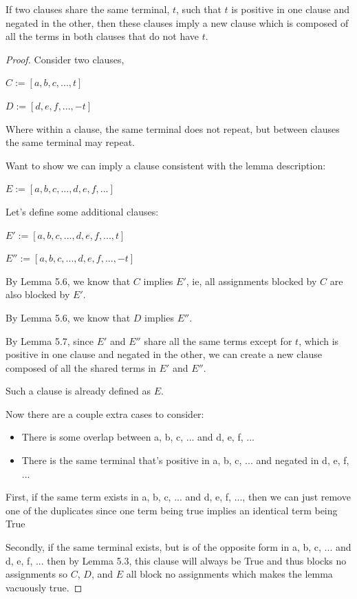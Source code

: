 \documentclass[manuscript]{acmart}
\begin{document}
    \begin{lemma}
        If two clauses share the same terminal, $t$, such that $t$ is 
        positive in one clause and negated in the other, then these clauses 
        imply a new clause which is composed of all the terms in both clauses 
        that do not have $t$.
    \end{lemma}
    \begin{proof}
        Consider two clauses, 

        $C := [a, b, c, ..., t]$
        
        $D := [d, e, f, ..., -t]$

        Where within a clause, the same terminal does not repeat, but between
        clauses the same terminal may repeat.

        Want to show we can imply a clause consistent with the lemma description:

        $E := [a, b, c, ..., d, e, f, ...]$

        Let's define some additional clauses:

        $E' := [a, b, c, ..., d, e, f, ..., t]$

        $E'' := [a, b, c, ..., d, e, f, ..., -t]$

        By Lemma 5.6, we know that $C$ implies $E'$, ie, all assignments blocked by
        $C$ are also blocked by $E'$.

        By Lemma 5.6, we know that $D$ implies $E''$.

        By Lemma 5.7, since $E'$ and $E''$ share all the same terms except 
        for $t$, which is positive in one clause and negated in the other, 
        we can create a new clause composed of all the shared terms in $E'$ 
        and $E''$.

        Such a clause is already defined as $E$.

        Now there are a couple extra cases to consider:
        
        \begin{itemize}
            \item There is some overlap between a, b, c, ... and d, e, f, ...
            \item There is the same terminal that's positive in a, b, c, ...
            and negated in d, e, f, ...
        \end{itemize}

        First, if the same term exists in a, b, c, ... and d, e, f, ..., then we
        can just remove one of the duplicates since one term being true implies an identical term being True

        Secondly, if the same terminal exists, but is of the opposite form in a, b, c, ... and d, e, f, ...
        then by Lemma 5.3, this clause will always be True and thus blocks no assignments so 
        $C$, $D$, and $E$ all block no assignments which makes the lemma vacuously true.
    \end{proof}
\end{document}
